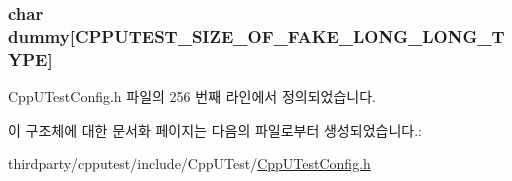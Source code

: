 \subsubsection[{\texorpdfstring{dummy}{dummy}}]{\setlength{\rightskip}{0pt plus 5cm}char dummy\mbox{[}{\bf C\+P\+P\+U\+T\+E\+S\+T\+\_\+\+S\+I\+Z\+E\+\_\+\+O\+F\+\_\+\+F\+A\+K\+E\+\_\+\+L\+O\+N\+G\+\_\+\+L\+O\+N\+G\+\_\+\+T\+Y\+PE}\mbox{]}}\hypertarget{structcpputest__ulonglong_a3aa94a3fffaef9e393bfe23c93aa6688}{}\label{structcpputest__ulonglong_a3aa94a3fffaef9e393bfe23c93aa6688}


Cpp\+U\+Test\+Config.\+h 파일의 256 번째 라인에서 정의되었습니다.



이 구조체에 대한 문서화 페이지는 다음의 파일로부터 생성되었습니다.\+:\begin{DoxyCompactItemize}
\item 
thirdparty/cpputest/include/\+Cpp\+U\+Test/\hyperlink{_cpp_u_test_config_8h}{Cpp\+U\+Test\+Config.\+h}\end{DoxyCompactItemize}
